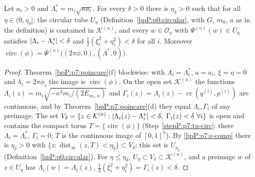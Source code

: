 \begin{lemma}\label{bpP:p7:tube}
Let $a_i>0$ and $\Lambda_i^*=m_i\sqrt{\kappa a_i}$. For every $\delta>0$ there is $\eta_\delta>0$ such that for all $\eta\in(0,\eta_\delta]$: the circular tube $U_\eta$ (Definition~\ref{bpP:p0:circular}, with $G$, $m_0$, $a$ as in the definition) is contained in $\mathcal K^{(n)}$, and every $w\in\mathcal O_n$ with $\Psi^{(n)}(w)\in U_\eta$ satisfies $\lvert \Lambda_i-\Lambda_i^*\rvert<\delta$ and $\tfrac12(\xi_i^2+\eta_i^2)<\delta$ for all $i$. Moreover $\operatorname{circ}(\phi)=\Psi^{(n)}\bigl((2\pi\phi,0),(\Lambda^*,0)\bigr)$.
\end{lemma}
\begin{proof}
\label{stepP:p7:tu-circ} Theorem~\ref{bpP:p7:poincare}(f) blockwise: with $\Lambda_i=\Lambda_i^*$, $a=a_i$, $\xi=\eta=0$ and $\lambda_i=2\pi\phi_i$ the image is $\operatorname{circ}(\phi)$.
\label{stepP:p7:tu-cont} On the open set $\mathcal K^{(n)}$ the functions $\Lambda_i(z)=m_i\sqrt{-\kappa^2m_i/(2E_{m_i,\kappa})}$ and $\Gamma_i(z)=\Lambda_i(z)-\operatorname{cr}(q^{(i)},p^{(i)})$ are continuous, and by Theorem~\ref{bpP:p7:poincare}(d) they equal $\Lambda_i,\Gamma_i$ of any preimage. The set $V_\delta=\{z\in\mathcal K^{(n)}:\abs{\Lambda_i(z)-\Lambda_i^*}<\delta,\ \Gamma_i(z)<\delta\ \forall i\}$ is open and contains the compact torus $T=\{\operatorname{circ}(\phi)\}$ (Step~\ref{stepP:p7:tu-circ}: there $\Lambda_i=\Lambda_i^*$, $\Gamma_i=0$; $T$ is the continuous image of $[0,1]^n$). By \ref{bpP:p7:e-comp} there is $\eta_\delta>0$ with $\{z:\operatorname{dist}_\infty(z,T)<\eta_\delta\}\subset V_\delta$; this set is $U_{\eta_\delta}$ (Definition~\ref{bpP:p0:circular}). For $\eta\le\eta_\delta$, $U_\eta\subset V_\delta\subset\mathcal K^{(n)}$, and a preimage $w$ of $z\in U_\eta$ has $\Lambda_i(w)=\Lambda_i(z)$, $\tfrac12(\xi_i^2+\eta_i^2)=\Gamma_i(z)<\delta$.
\end{proof}

